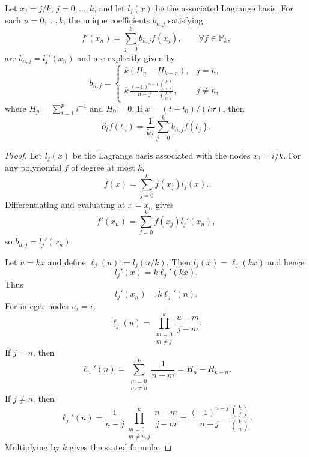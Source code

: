 \documentclass[10pt,a4paper]{amsart}
\begin{document}
	\begin{theorem}
		Let $x_j=j/k$, $j=0,\ldots,k$, and let $l_j(x)$ be the associated Lagrange basis. For each $n=0,\ldots,k$, the unique coefficients $b_{n,j}$ satisfying
		\[
		f'(x_n)=\sum_{j=0}^{k} b_{n,j}f(x_j),
		\qquad \forall f\in\mathbb{P}_k,
		\]
		are $b_{n,j}=l_j'(x_n)$ and are explicitly given by
		\[
		b_{n,j}=
		\begin{cases}
			\displaystyle k\left(H_n-H_{k-n}\right),& j=n,\\[1ex]
			\displaystyle k\,\frac{(-1)^{n-j}}{n-j}\frac{\binom{k}{j}}{\binom{k}{n}},& j\ne n,
		\end{cases}
		\]
		where $H_p=\sum_{i=1}^p i^{-1}$ and $H_0=0$. If $x=(t-t_0)/(k\tau)$, then
		\[
		\partial_t f(t_n)
		=
		\frac{1}{k\tau}
		\sum_{j=0}^{k}b_{n,j}f(t_j).
		\]
	\end{theorem}

	\begin{proof}
		Let $l_j(x)$ be the Lagrange basis associated with the nodes $x_i=i/k$. For any polynomial $f$ of degree at most $k$,
		\[
		f(x)=\sum_{j=0}^{k} f(x_j)l_j(x).
		\]
		Differentiating and evaluating at $x=x_n$ gives
		\[
		f'(x_n)=\sum_{j=0}^{k}f(x_j)l_j'(x_n),
		\]
		so $b_{n,j}=l_j'(x_n)$.
		
		Let $u=kx$ and define $\ell_j(u):=l_j(u/k)$. Then $l_j(x)=\ell_j(kx)$ and hence
		\[
		l_j'(x)=k\ell_j'(kx).
		\]
		Thus
		\[
		l_j'(x_n)=k\ell_j'(n).
		\]
		For integer nodes $u_i=i$,
		\[
		\ell_j(u)=\prod_{\substack{m=0\\m\ne j}}^{k}\frac{u-m}{j-m}.
		\]
		If $j=n$, then
		\[
		\ell_n'(n)=
		\sum_{\substack{m=0\\m\ne n}}^{k}\frac{1}{n-m}
		=
		H_n-H_{k-n}.
		\]
		If $j\ne n$, then
		\[
		\ell_j'(n)
		=
		\frac{1}{n-j}
		\prod_{\substack{m=0\\m\ne n,j}}^{k}
		\frac{n-m}{j-m}
		=
		\frac{(-1)^{n-j}}{n-j}
		\frac{\binom{k}{j}}{\binom{k}{n}}.
		\]
		Multiplying by $k$ gives the stated formula.
	\end{proof}
\end{document}
